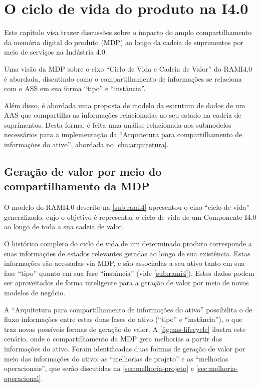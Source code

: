 \chapter{O ciclo de vida do produto na I4.0}
\label{cha:ciclo-de-vida}

Este capítulo visa trazer discussões sobre o impacto do amplo compartilhamento da memória digital do produto (MDP) ao longo da cadeia de suprimentos por meio de serviços na Indústria 4.0.


Uma visão da MDP sobre o eixo ``Ciclo de Vida e Cadeia de Valor'' do RAMI4.0 é abordada, discutindo como o compartilhamento de informações se relaciona com o ASS em sua forma ``tipo'' e ``instância''.

Além disso, é abordada uma proposta de modelo da estrutura de dados de um AAS que compartilha as informações relacionadas ao seu estado na cadeia de suprimentos. Desta forma, é feita uma análise relacionada aos submodelos necessários para a implementação da ``Arquitetura para compartilhamento de informações do ativo'', abordada no \autoref{cha:arquitetura}.

\section{Geração de valor por meio do compartilhamento da MDP}

O modelo do RAMI4.0 descrito na \autoref{sub:rami4} apresentou o eixo ``ciclo de vida'' generalizado, cujo o objetivo é representar o ciclo de vida de um Componente I4.0 ao longo de toda a sua cadeia de valor.

O histórico completo do ciclo de vida de um determinado produto corresponde a suas informações de estados relevantes geradas ao longo de sua existência. Estas informações são acessadas via MDP, e são associadas a seu ativo tanto em sua fase ``tipo'' quanto em sua fase ``instância'' (vide \autoref{sub:rami4}). Estes dados podem ser aproveitados de forma inteligente para a geração de valor por meio de novos modelos de negócio.

A ``Arquitetura para compartilhamento de informações do ativo'' possibilita o de fluxo informações entre estas duas fases do ativo (``tipo'' e ``instância''), o que traz novas possíveis formas de geração de valor. A \autoref{fig:aas-lifecycle} ilustra este cenário, onde o compartilhamento da MDP gera melhorias a partir das informações do ativo. Foram identificadas duas formas de geração de valor por meio das informações do ativo: as ``melhorias de projeto'' e as ``melhorias operacionais'', que serão discutidas na \autoref{sec:melhoria-projeto} e \autoref{sec:melhoria-operacional}.

